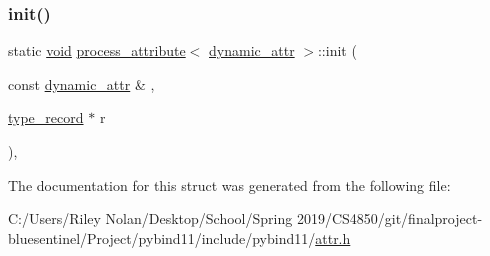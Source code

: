 \subsubsection{\texorpdfstring{init()}{init()}}
{\footnotesize\ttfamily static \mbox{\hyperlink{_s_d_l__opengles2__gl2ext_8h_ae5d8fa23ad07c48bb609509eae494c95}{void}} \mbox{\hyperlink{structprocess__attribute}{process\+\_\+attribute}}$<$ \mbox{\hyperlink{structdynamic__attr}{dynamic\+\_\+attr}} $>$\+::init (\begin{DoxyParamCaption}\item[{const \mbox{\hyperlink{structdynamic__attr}{dynamic\+\_\+attr}} \&}]{,  }\item[{\mbox{\hyperlink{structtype__record}{type\+\_\+record}} $\ast$}]{r }\end{DoxyParamCaption})\hspace{0.3cm}{\ttfamily [inline]}, {\ttfamily [static]}}



The documentation for this struct was generated from the following file\+:\begin{DoxyCompactItemize}
\item 
C\+:/\+Users/\+Riley Nolan/\+Desktop/\+School/\+Spring 2019/\+C\+S4850/git/finalproject-\/bluesentinel/\+Project/pybind11/include/pybind11/\mbox{\hyperlink{attr_8h}{attr.\+h}}\end{DoxyCompactItemize}
